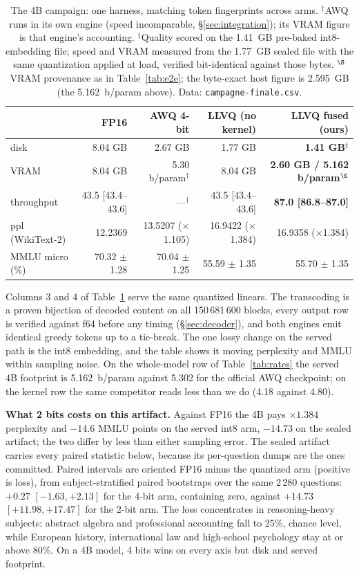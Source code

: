 \begin{table}[t]
\centering
\footnotesize
\begin{tabular}{lrrrr}
\toprule
 & FP16 & AWQ 4-bit & LLVQ (no kernel) & LLVQ fused (ours) \\
\midrule
disk & 8.04 GB & 2.67 GB & 1.77 GB & \textbf{1.41 GB}$^{\ddagger}$ \\
VRAM & 8.04 GB & 5.30 b/param$^{\dagger}$ & 8.04 GB & \textbf{2.60 GB / 5.162 b/param}$^{\S}$ \\
throughput & 43.5 [43.4--43.6] & ---$^{\dagger}$ & 43.5 [43.4--43.6] & \textbf{87.0 [86.8--87.0]} \\
ppl (WikiText-2) & 12.2369 & 13.5207 ($\times$1.105) & 16.9422 ($\times$1.384) & 16.9358 ($\times$1.384) \\
MMLU micro (\%) & 70.32 $\pm$ 1.28 & 70.04 $\pm$ 1.25 & 55.59 $\pm$ 1.35 & 55.70 $\pm$ 1.35 \\
\bottomrule
\end{tabular}
\caption{The 4B campaign: one harness, matching token fingerprints across
arms. $^{\dagger}$AWQ runs in its own engine (speed incomparable,
\S\ref{sec:integration}); its VRAM figure is that engine's accounting.
$^{\ddagger}$Quality scored on the 1.41~GB pre-baked int8-embedding file;
speed and VRAM measured from the 1.77~GB sealed file with the same
quantization applied at load, verified bit-identical against those bytes.
$^{\S}$VRAM provenance as in Table~\ref{tab:e2e}; the byte-exact host
figure is 2.595~GB (the 5.162~b/param above). Data:
\texttt{campagne-finale.csv}.}
\label{tab:campaign}
\end{table}

Columns 3 and 4 of Table~\ref{tab:campaign} serve the same quantized
linears. The transcoding is a proven bijection of decoded content on all
150\,681\,600 blocks, every output row is verified against f64 before any
timing (\S\ref{sec:decoder}), and both engines emit identical greedy tokens
up to a tie-break. The one lossy change on the served path is the int8
embedding, and the table shows it moving perplexity and MMLU within sampling
noise. On the whole-model row of Table~\ref{tab:rates} the served 4B
footprint is 5.162~b/param against 5.302 for the official AWQ checkpoint;
on the kernel row the same competitor reads less than we do (4.18 against
4.80).

\textbf{What 2 bits costs on this artifact.} Against FP16 the 4B pays $\times1.384$
perplexity and $-14.6$ MMLU points on the served int8 arm, $-14.73$ on the
sealed artifact; the two differ by less than either sampling error. The
sealed artifact carries every paired statistic below, because its
per-question dumps are the ones committed. Paired intervals are oriented
FP16 minus the quantized arm (positive is loss), from subject-stratified
paired bootstraps over the same 2\,280 questions: $+0.27$ $[-1.63, +2.13]$
for the 4-bit arm, containing zero, against $+14.73$ $[+11.98, +17.47]$ for
the 2-bit arm. The loss concentrates in reasoning-heavy subjects: abstract
algebra and professional accounting fall to 25\%, chance level, while
European history, international law and high-school psychology stay at or
above 80\%. On a 4B model, 4 bits wins on every axis but disk and served
footprint.

